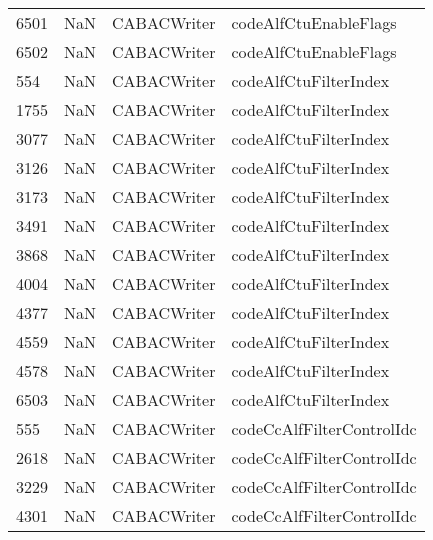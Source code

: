 \begin{tabular}{llll}
6501 &                   NaN &                CABACWriter &                     codeAlfCtuEnableFlags \\
6502 &                   NaN &                CABACWriter &                     codeAlfCtuEnableFlags \\
554  &                   NaN &                CABACWriter &                     codeAlfCtuFilterIndex \\
1755 &                   NaN &                CABACWriter &                     codeAlfCtuFilterIndex \\
3077 &                   NaN &                CABACWriter &                     codeAlfCtuFilterIndex \\
3126 &                   NaN &                CABACWriter &                     codeAlfCtuFilterIndex \\
3173 &                   NaN &                CABACWriter &                     codeAlfCtuFilterIndex \\
3491 &                   NaN &                CABACWriter &                     codeAlfCtuFilterIndex \\
3868 &                   NaN &                CABACWriter &                     codeAlfCtuFilterIndex \\
4004 &                   NaN &                CABACWriter &                     codeAlfCtuFilterIndex \\
4377 &                   NaN &                CABACWriter &                     codeAlfCtuFilterIndex \\
4559 &                   NaN &                CABACWriter &                     codeAlfCtuFilterIndex \\
4578 &                   NaN &                CABACWriter &                     codeAlfCtuFilterIndex \\
6503 &                   NaN &                CABACWriter &                     codeAlfCtuFilterIndex \\
555  &                   NaN &                CABACWriter &                 codeCcAlfFilterControlIdc \\
2618 &                   NaN &                CABACWriter &                 codeCcAlfFilterControlIdc \\
3229 &                   NaN &                CABACWriter &                 codeCcAlfFilterControlIdc \\
4301 &                   NaN &                CABACWriter &                 codeCcAlfFilterControlIdc \\

\end{tabular}
